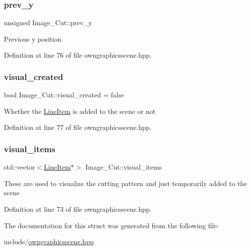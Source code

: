 \subsubsection{\texorpdfstring{prev\+\_\+y}{prev\_y}}
{\footnotesize\ttfamily unsigned Image\+\_\+\+Cut\+::prev\+\_\+y}

Previous y position 

Definition at line 76 of file owngraphicsscene.\+hpp.

\mbox{\label{structImage__Cut_acbae7507f135d85e9f2f9724fbc2a643}} 
\subsubsection{\texorpdfstring{visual\+\_\+created}{visual\_created}}
{\footnotesize\ttfamily bool Image\+\_\+\+Cut\+::visual\+\_\+created = false}

Whether the \mbox{\hyperlink{classLineItem}{Line\+Item}} is added to the scene or not 

Definition at line 77 of file owngraphicsscene.\+hpp.

\mbox{\label{structImage__Cut_ad56f1d72a3d7c5488fec27eaf5c6fbd9}} 
\subsubsection{\texorpdfstring{visual\+\_\+items}{visual\_items}}
{\footnotesize\ttfamily std\+::vector$<$\mbox{\hyperlink{classLineItem}{Line\+Item}}$\ast$$>$ Image\+\_\+\+Cut\+::visual\+\_\+items}

These are used to visualize the cutting pattern and just temporarily added to the scene 

Definition at line 73 of file owngraphicsscene.\+hpp.



The documentation for this struct was generated from the following file\+:\begin{DoxyCompactItemize}
\item 
include/\mbox{\hyperlink{owngraphicsscene_8hpp}{owngraphicsscene.\+hpp}}\end{DoxyCompactItemize}
